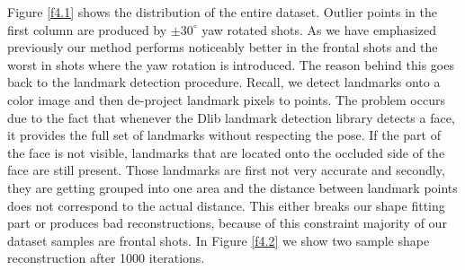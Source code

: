 Figure \ref{f4.1} shows the distribution of the entire dataset.  Outlier points in the first column are produced by $\pm 30^\circ$ yaw rotated shots. As we have emphasized previously our method performs noticeably better in the frontal shots and the worst in shots where the yaw rotation is introduced. The reason behind this goes back to the landmark detection procedure. Recall, we detect landmarks onto a color image and then de-project landmark pixels to points. The problem occurs due to the fact that whenever the Dlib landmark detection library detects a face, it provides the full set of landmarks without respecting the pose. If the part of the face is not visible, landmarks that are located onto the occluded side of the face are still present. Those landmarks are first not very accurate and secondly, they are getting grouped into one area and the distance between landmark points does not correspond to the actual distance.  This either breaks our shape fitting part or produces bad reconstructions, because of this constraint majority of our dataset samples are frontal shots. In Figure \ref{f4.2} we show two sample shape reconstruction after 1000 iterations. 

